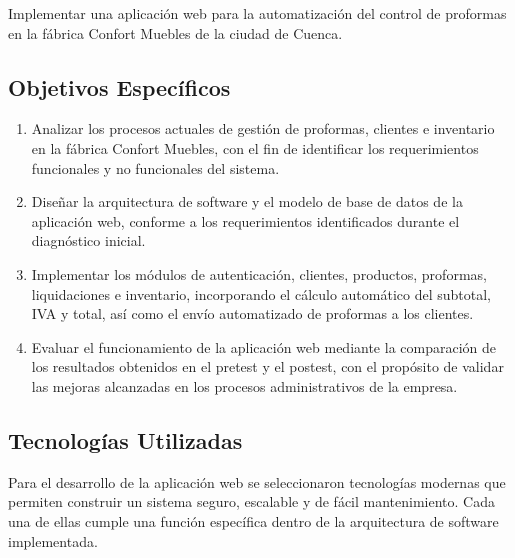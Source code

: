 Implementar una aplicación web para la automatización del control de proformas en la fábrica Confort Muebles de la ciudad de Cuenca.

\subsection{Objetivos Específicos}

\begin{enumerate}
    \item Analizar los procesos actuales de gestión de proformas, clientes e inventario en la fábrica Confort Muebles, con el fin de identificar los requerimientos funcionales y no funcionales del sistema.

    \item Diseñar la arquitectura de software y el modelo de base de datos de la aplicación web, conforme a los requerimientos identificados durante el diagnóstico inicial.

    \item Implementar los módulos de autenticación, clientes, productos, proformas, liquidaciones e inventario, incorporando el cálculo automático del subtotal, IVA y total, así como el envío automatizado de proformas a los clientes.

    \item Evaluar el funcionamiento de la aplicación web mediante la comparación de los resultados obtenidos en el pretest y el postest, con el propósito de validar las mejoras alcanzadas en los procesos administrativos de la empresa.
\end{enumerate}
\subsection{Tecnologías Utilizadas}

Para el desarrollo de la aplicación web se seleccionaron tecnologías modernas que permiten construir un sistema seguro, escalable y de fácil mantenimiento. Cada una de ellas cumple una función específica dentro de la arquitectura de software implementada.

